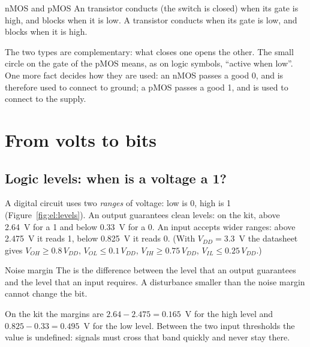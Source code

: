 \begin{definition}{nMOS and pMOS}
An  transistor conducts (the switch is closed) when its gate is
high, and blocks when it is low. A  transistor conducts when its
gate is low, and blocks when it is high.
\end{definition}

The two types are complementary: what closes one opens the other. The small
circle on the gate of the pMOS means, as on logic symbols, ``active when
low''. One more fact decides how they are used: an nMOS passes a good 0, and
is therefore used to connect to ground; a pMOS passes a good 1, and is used
to connect to the supply.

\section{From volts to bits}

\subsection{Logic levels: when is a voltage a 1?}

A digital circuit uses two \emph{ranges} of voltage: low is 0, high is 1
(Figure~\ref{fig:el:levels}). An output guarantees clean levels: on the kit,
above 2.64~V for a 1 and below 0.33~V for a 0. An input accepts wider ranges:
above 2.475~V it reads 1, below 0.825~V it reads 0. (With $V_{DD}=3.3$~V the
datasheet gives $V_{OH}\ge 0.8\,V_{DD}$, $V_{OL}\le 0.1\,V_{DD}$,
$V_{IH}\ge 0.75\,V_{DD}$, $V_{IL}\le 0.25\,V_{DD}$.)

\begin{definition}{Noise margin}
The  is the difference between the level that an output
guarantees and the level that an input requires. A disturbance smaller than
the noise margin cannot change the bit.
\end{definition}

On the kit the margins are $2.64-2.475=0.165$~V for the high level and
$0.825-0.33=0.495$~V for the low level. Between the two input thresholds the
value is undefined: signals must cross that band quickly and never stay there.


